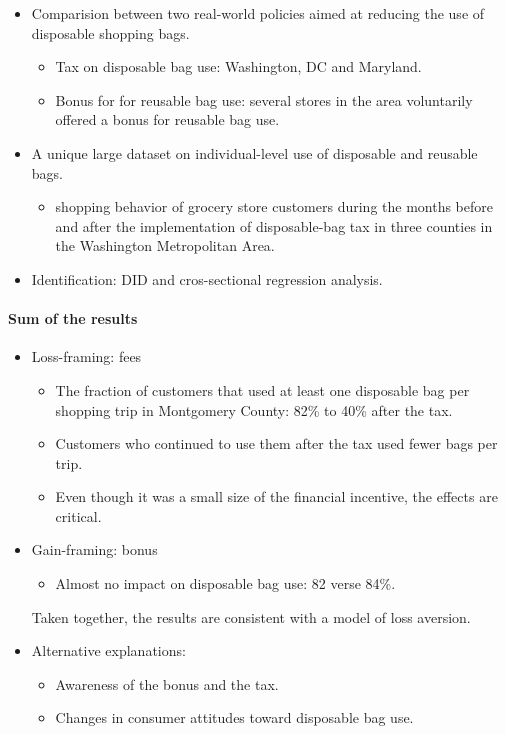 \documentclass[../root]{subfiles}
\begin{document}
    \begin{itemize}
      \item Comparision between two real-world policies aimed at reducing the use of disposable shopping bags.
      \begin{itemize}
        \item Tax on disposable bag use: Washington, DC and Maryland.
        \item Bonus for for reusable bag use: several stores in the area voluntarily offered a bonus for reusable bag use.
      \end{itemize}
      \item A unique large dataset on individual-level use of disposable and reusable bags.
      \begin{itemize}
        \item shopping behavior of grocery store customers during the months before and after the implementation of disposable-bag tax in three counties in the Washington Metropolitan Area.
      \end{itemize}
      \item Identification: DID and cros-sectional regression analysis.
    \end{itemize}

    \paragraph{Sum of the results}

    \begin{itemize}
      \item Loss-framing: fees
      \begin{itemize}
        \item The fraction of customers that used at least one disposable bag per shopping trip in Montgomery County: 82\% to 40\% after the tax.
        \item Customers who continued to use them after the tax used fewer bags per trip.
        \item Even though it was a small size of the financial incentive, the effects are critical.
      \end{itemize}
      \item Gain-framing: bonus
      \begin{itemize}
        \item Almost no impact on disposable bag use: 82 verse 84\%.
      \end{itemize}
      Taken together, the results are consistent with a model of loss aversion.
      \item Alternative explanations:
      \begin{itemize}
        \item Awareness of the bonus and the tax.
        \item Changes in consumer attitudes toward disposable bag use.
      \end{itemize}
    \end{itemize}
\end{document}

